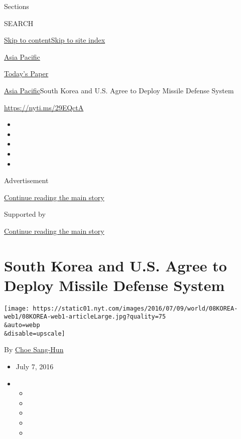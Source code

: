 Sections

SEARCH

\protect\hyperlink{site-content}{Skip to
content}\protect\hyperlink{site-index}{Skip to site index}

\href{https://www.nytimes.com/section/world/asia}{Asia Pacific}

\href{https://myaccount.nytimes.com/auth/login?response_type=cookie\&client_id=vi}{}

\href{https://www.nytimes.com/section/todayspaper}{Today's Paper}

\href{/section/world/asia}{Asia Pacific}\textbar{}South Korea and U.S.
Agree to Deploy Missile Defense System

\url{https://nyti.ms/29EQctA}

\begin{itemize}
\item
\item
\item
\item
\item
\end{itemize}

Advertisement

\protect\hyperlink{after-top}{Continue reading the main story}

Supported by

\protect\hyperlink{after-sponsor}{Continue reading the main story}

\hypertarget{south-korea-and-us-agree-to-deploy-missile-defense-system}{%
\section{South Korea and U.S. Agree to Deploy Missile Defense
System}\label{south-korea-and-us-agree-to-deploy-missile-defense-system}}

\texttt{[image: https://static01.nyt.com/images/2016/07/09/world/08KOREA-web1/08KOREA-web1-articleLarge.jpg?quality=75\\\&auto=webp\\\&disable=upscale]}

By \href{http://www.nytimes.com/by/choe-sang-hun}{Choe Sang-Hun}

\begin{itemize}
\item
  July 7, 2016
\item
  \begin{itemize}
  \item
  \item
  \item
  \item
  \item
  \end{itemize}
\end{itemize}

